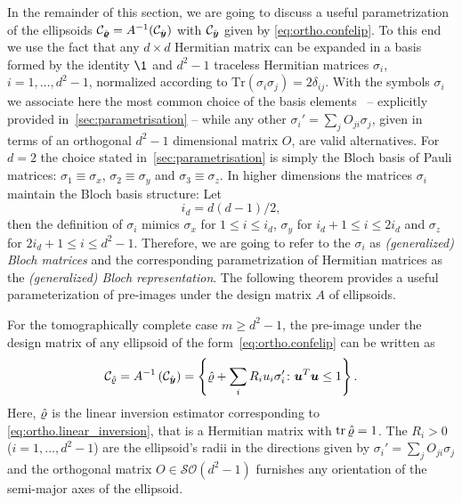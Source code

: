 In the remainder of this section, we are going to discuss a useful parametrization of the ellipsoids $\mathcal{C}_{\hat{\boldsymbol{\varrho}}} = A^{-1}(\mathcal{C}_{\hat{\boldsymbol{y}}})$ with $\mathcal{C}_{\hat{\boldsymbol{y}}}$ given by \cref{eq:ortho.confelip}.
To this end we use the fact that any $d\times d$ Hermitian matrix can be expanded in a basis formed by the identity $\1$ and $d^{2}-1$ traceless Hermitian matrices $\sigma_{i}$, $i=1,\ldots,d^{2}-1$, normalized according to $\textrm{Tr}(\sigma_{i}\sigma_{j})=2\delta_{ij}$.
With the symbols $\sigma_{i}$ we associate here the most common choice of the basis elements~\cite{Kimura_2003_Bloch}  --  explicitly provided in~\ref{sec:parametrisation} -- while any other $\sigma_{i}'=\sum_{j}O_{ji}\sigma_{j}$, given in terms of an orthogonal $d^{2}-1$ dimensional matrix $O$, are valid alternatives.
For $d=2$ the choice stated in~\ref{sec:parametrisation} is simply the Bloch basis of Pauli matrices: $\sigma_{1}\equiv\sigma_{x}$, $\sigma_{2}\equiv\sigma_{y}$ and $\sigma_{3}\equiv\sigma_{z}$.
In higher dimensions the matrices $\sigma_{i}$ maintain the Bloch basis structure:
Let
\[
  \label{eq:ortho.x_yz_index}
  i_{d}=d(d-1)/2,
\]
then the definition of $\sigma_i$ mimics $\sigma_{x}$ for $1\leq i\leq i_{d}$, $\sigma_{y}$ for $i_{d}+1\leq i\leq2i_{d}$ and $\sigma_{z}$ for $2i_{d}+1\leq i\leq d^{2}-1$.
Therefore, we are going to refer to the $\sigma_{i}$ as \emph{(generalized) Bloch matrices} and the corresponding parametrization of Hermitian matrices as the \emph{(generalized) Bloch representation}.
The following theorem provides a useful parameterization of pre-images under the design matrix $A$ of ellipsoids.
\begin{theorem}\label{thm:ortho.ellipsoids}
  For the tomographically complete case $m \geq d^2 - 1$, the pre-image under the design matrix of any ellipsoid of the form~\eqref{eq:ortho.confelip} can be written as
  \[
    \label{eq:ortho.ellipsoid}
    \mathcal{C}_{\hat{\varrho}} = A^{-1}\left( \mathcal{C}_{\hat{\boldsymbol{y}}} \right) = \left\{ \hat{\varrho} + \sum_{i}R_{i}u_{i}\sigma_{i}'\colon \boldsymbol{u}^{T}\boldsymbol{u}\leq1 \right\}.
  \]
  Here, $\hat{\varrho}$ is the linear inversion estimator corresponding to \cref{eq:ortho.linear_inversion}, that is a Hermitian matrix with $\operatorname{tr} \hat{\varrho} = 1$. 
  The $R_{i}>0$ ($i=1,\ldots,d^{2}-1$) are the ellipsoid's radii in the directions given by $\sigma_{i}'=\sum_{j}O_{ji}\sigma_{j}$ and the orthogonal matrix $O\in\mathcal{SO}\left(d^{2}-1\right)$ furnishes any orientation of the semi-major axes of the ellipsoid.
\end{theorem}
